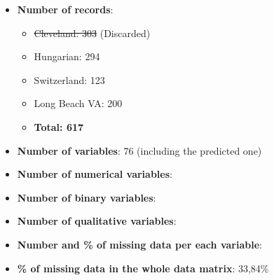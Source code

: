 \documentclass[a4paper,12pt]{article}
\begin{document}
    \begin{itemize}

        \item \textbf{Number of records}:
        \begin{itemize}

            \item \st{Cleveland: 303} (Discarded)
            \item Hungarian: 294
            \item Switzerland: 123
            \item Long Beach VA: 200
            \item \textbf{Total: 617}

        \end{itemize}
        \item \textbf{Number of variables}: 76 (including the predicted one)
        \item \textbf{Number of numerical variables}:
        \item \textbf{Number of binary variables}:
        \item \textbf{Number of qualitative variables}:
        \item \textbf{Number and \% of missing data per each variable}:
        \item \textbf{\% of missing data in the whole data matrix}: 33,84\%

    \end{itemize}
\end{document}
